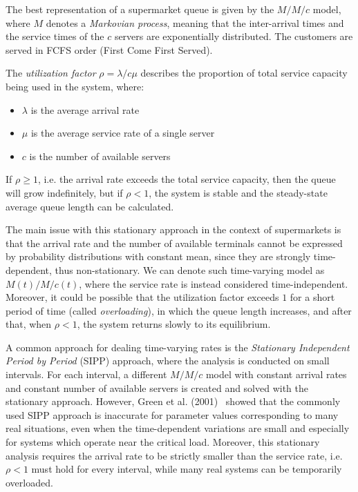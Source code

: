 The best representation of a supermarket queue is given by the \( M/M/c \) model, where \( M \) denotes a \emph{Markovian process}, meaning that the inter-arrival times and the service times of the \( c \) servers are exponentially distributed. The customers are served in FCFS order (First Come First Served).

The \emph{utilization factor} \( \rho = \lambda/c\mu \) describes the proportion of total service capacity being used in the system, where:
\begin{itemize}
  \item \( \lambda \) is the average arrival rate
  \item \( \mu \) is the average service rate of a single server
  \item \( c \) is the number of available servers
\end{itemize}
If \( \rho \ge 1 \), i.e. the arrival rate exceeds the total service capacity, then the queue will grow indefinitely, but if \( \rho < 1 \), the system is stable and the steady-state average queue length can be calculated.

The main issue with this stationary approach in the context of supermarkets is that the arrival rate and the number of available terminals cannot be expressed by probability distributions with constant mean, since they are strongly time-dependent, thus non-stationary. We can denote such time-varying model as \( M(t)/M/c(t) \), where the service rate is instead considered time-independent. Moreover, it could be possible that the utilization factor exceeds \( 1 \) for a short period of time (called \emph{overloading}), in which the queue length increases, and after that, when \( \rho < 1 \), the system returns slowly to its equilibrium.

A common approach for dealing time-varying rates is the \emph{Stationary Independent Period by Period} (SIPP) approach, where the analysis is conducted on small intervals. For each interval, a different \( M/M/c \) model with constant arrival rates and constant number of available servers is created and solved with the stationary approach. However, Green et al. (2001)~\cite{green2001} showed that the commonly used SIPP approach is inaccurate for parameter values corresponding to many real situations, even when the time-dependent variations are small and especially for systems which operate near the critical load. Moreover, this stationary analysis requires the arrival rate to be strictly smaller than the service rate, i.e. \( \rho < 1 \) must hold for every interval, while many real systems can be temporarily overloaded.

